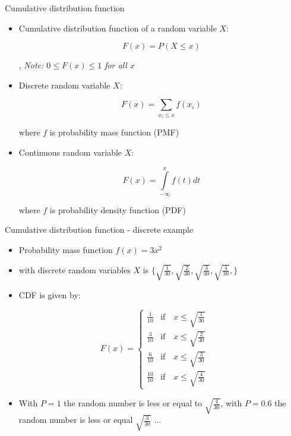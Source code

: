 \begin{slide}[toc=CDF]{Cumulative distribution function}
\null\vfill

  \begin{itemize}
    
    \item Cumulative distribution function of a random variable $X$:
    
    $$F(x) = P (X \leq x)$$
    
    \sep
    {\it\color{pdcolor3} Note: $0 \leq F(x) \leq 1$ for all $x$}
        
    \item Discrete random variable $X$:
    
    $$F (x) = \sum\limits_{x_i \leq x} f (x_i)$$

    where $f$ is probability mass function (PMF)
    
    \item Continuous random variable $X$:
    
    $$F (x) = \int\limits_{-\infty}^{x} f (t) dt$$ 
        
    where $f$ is probability density function (PDF)

    \end{itemize}

\vfill\null
\end{slide}

\begin{slide}[toc=CDF discrete]{Cumulative distribution function - discrete example}
\null\vfill

  \begin{itemize}
    
    \item Probability mass function $f(x) = 3x^2$
    \item[] with discrete random variables $X$ is $\{\sqrt{\frac{1}{30}}, \sqrt{\frac{2}{30}}, \sqrt{\frac{3}{30}}, \sqrt{\frac{4}{30}},\}$
    \item CDF is given by:
    
  \end{itemize}
  
  \twocolumn
  {
  $$F (x) = \begin{cases}
	      \frac{1}{10}  & \mbox{if~~~} x \leq \sqrt{\frac{1}{30}} \\
	      \frac{3}{10}  & \mbox{if~~~} x \leq \sqrt{\frac{2}{30}} \\
	      \frac{6}{10}  & \mbox{if~~~} x \leq \sqrt{\frac{3}{30}} \\
	      \frac{10}{10} & \mbox{if~~~} x \leq \sqrt{\frac{4}{30}} 
	    \end{cases}
  $$
  }
  {
    
  }
  \vspace{-10pt}
  \begin{itemize}
  
    \item With $P = 1$ the random number is less or equal to $\sqrt{\frac{4}{30}}$, with $P = 0.6$ the random number is less or equal $\sqrt{\frac{3}{30}}$ ...
    
  \end{itemize}

\vfill\null
\end{slide}

